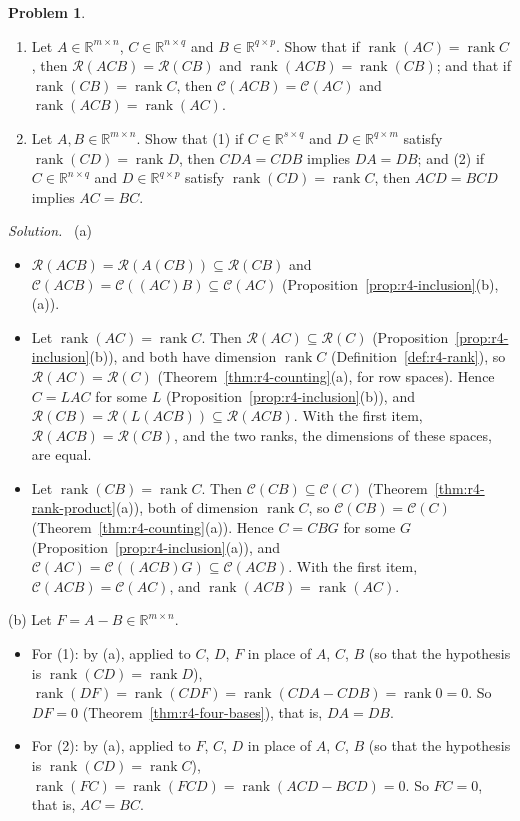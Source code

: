 \documentclass[12pt]{article}
\newcommand{\R}{\mathbb R}
\DeclareMathOperator{\rank}{rank}
\theoremstyle{definition}
\newtheorem{problem}{Problem}
\newenvironment{solution}{\par\noindent\textit{Solution.}\ }{\par\smallskip}
\begin{document}
\begin{problem}\label{r4-ex-cancellation}
\begin{enumerate}
\item Let \(A\in\R^{m\times n}\), \(C\in\R^{n\times q}\) and \(B\in\R^{q\times p}\). Show that if
\(\rank(AC)=\rank C\), then \(\mathcal R(ACB)=\mathcal R(CB)\) and \(\rank(ACB)=\rank(CB)\); and that if
\(\rank(CB)=\rank C\), then \(\mathcal C(ACB)=\mathcal C(AC)\) and \(\rank(ACB)=\rank(AC)\).
\item Let \(A,B\in\R^{m\times n}\). Show that (1) if \(C\in\R^{s\times q}\) and \(D\in\R^{q\times m}\) satisfy
\(\rank(CD)=\rank D\), then \(CDA=CDB\) implies \(DA=DB\); and (2) if \(C\in\R^{n\times q}\) and \(D\in\R^{q\times p}\)
satisfy \(\rank(CD)=\rank C\), then \(ACD=BCD\) implies \(AC=BC\).
\end{enumerate}
\end{problem}
\begin{solution}
(a)
\begin{itemize}
\item \(\mathcal R(ACB)=\mathcal R(A(CB))\subseteq\mathcal R(CB)\) and
\(\mathcal C(ACB)=\mathcal C((AC)B)\subseteq\mathcal C(AC)\) (Proposition~\ref{prop:r4-inclusion}(b),(a)).
\item Let \(\rank(AC)=\rank C\). Then \(\mathcal R(AC)\subseteq\mathcal R(C)\) (Proposition~\ref{prop:r4-inclusion}(b)),
and both have dimension \(\rank C\) (Definition~\ref{def:r4-rank}), so \(\mathcal R(AC)=\mathcal R(C)\)
(Theorem~\ref{thm:r4-counting}(a), for row spaces). Hence \(C=LAC\) for some \(L\)
(Proposition~\ref{prop:r4-inclusion}(b)), and
\(\mathcal R(CB)=\mathcal R(L(ACB))\subseteq\mathcal R(ACB)\). With the first item,
\(\mathcal R(ACB)=\mathcal R(CB)\), and the two ranks, the dimensions of these spaces, are equal.
\item Let \(\rank(CB)=\rank C\). Then \(\mathcal C(CB)\subseteq\mathcal C(C)\) (Theorem~\ref{thm:r4-rank-product}(a)),
both of dimension \(\rank C\), so \(\mathcal C(CB)=\mathcal C(C)\) (Theorem~\ref{thm:r4-counting}(a)). Hence \(C=CBG\)
for some \(G\) (Proposition~\ref{prop:r4-inclusion}(a)), and
\(\mathcal C(AC)=\mathcal C((ACB)G)\subseteq\mathcal C(ACB)\). With the first item,
\(\mathcal C(ACB)=\mathcal C(AC)\), and \(\rank(ACB)=\rank(AC)\).
\end{itemize}
(b) Let \(F=A-B\in\R^{m\times n}\).
\begin{itemize}
\item For (1): by (a), applied to \(C\), \(D\), \(F\) in place of \(A\), \(C\), \(B\) (so that the hypothesis is
\(\rank(CD)=\rank D\)), \(\rank(DF)=\rank(CDF)=\rank(CDA-CDB)=\rank0=0\). So \(DF=0\) (Theorem~\ref{thm:r4-four-bases}),
that is, \(DA=DB\).
\item For (2): by (a), applied to \(F\), \(C\), \(D\) in place of \(A\), \(C\), \(B\) (so that the hypothesis is
\(\rank(CD)=\rank C\)), \(\rank(FC)=\rank(FCD)=\rank(ACD-BCD)=0\). So \(FC=0\), that is, \(AC=BC\).
\end{itemize}
\end{solution}
\end{document}
